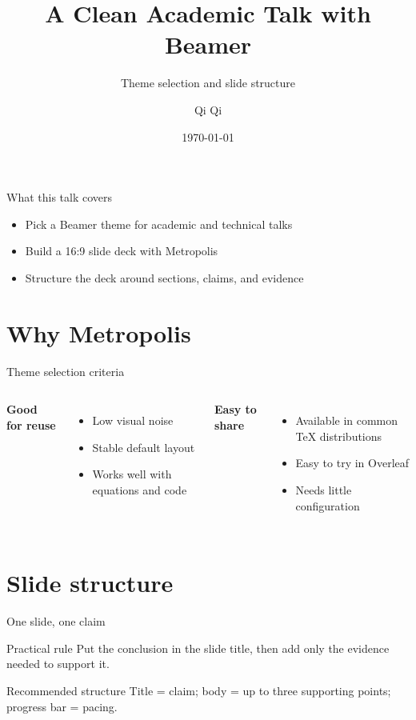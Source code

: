 \documentclass[aspectratio=169,11pt]{beamer}
\title{A Clean Academic Talk with Beamer}
\subtitle{Theme selection and slide structure}
\author{Qi Qi}
\institute{Personal Blog Demo}
\date{\today}
\begin{document}
\maketitle

\begin{frame}{What this talk covers}
  \begin{itemize}
    \item Pick a Beamer theme for academic and technical talks
    \item Build a 16:9 slide deck with Metropolis
    \item Structure the deck around sections, claims, and evidence
  \end{itemize}
\end{frame}

\section{Why Metropolis}

\begin{frame}{Theme selection criteria}
  \begin{columns}[T,onlytextwidth]
      \textbf{Good for reuse}
      \begin{itemize}
        \item Low visual noise
        \item Stable default layout
        \item Works well with equations and code
      \end{itemize}

      \textbf{Easy to share}
      \begin{itemize}
        \item Available in common TeX distributions
        \item Easy to try in Overleaf
        \item Needs little configuration
      \end{itemize}
  \end{columns}
\end{frame}

\section{Slide structure}

\begin{frame}{One slide, one claim}
  \begin{block}{Practical rule}
    Put the conclusion in the slide title, then add only the evidence needed to support it.
  \end{block}

  \begin{exampleblock}{Recommended structure}
    Title = claim; body = up to three supporting points; progress bar = pacing.
  \end{exampleblock}
\end{frame}
\end{document}
